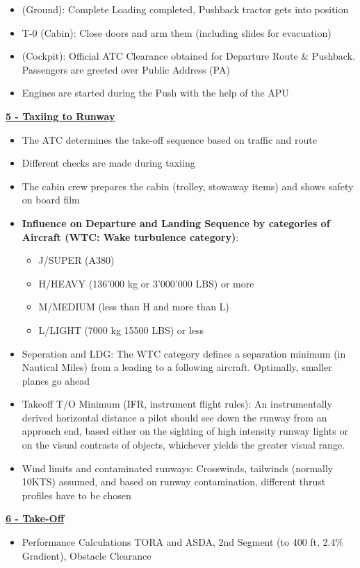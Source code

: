 \documentclass[9pt, landscape, fleqn]{scrartcl}
\begin{document}
\begin{multicols*}{3}
\begin{itemize}
    \item (Ground): Complete Loading completed, Pushback tractor gets into position 
    \item T-0 (Cabin): Close doors and arm them (including slides for evacuation)
    \item (Cockpit): Official ATC Clearance obtained for Departure Route \& Pushback. Passengers are greeted over Public Address (PA)
    \item Engines are started during the Push with the help of the APU   
\end{itemize}
\underline{\textbf{5 - Taxiing to Runway }}
\begin{itemize}
    \item The ATC determines the take-off sequence based on traffic and route 
    \item Different checks are made during taxiing 
    \item The cabin crew prepares the cabin (trolley, stowaway items) and shows safety on board film 
    \item \textbf{Influence on Departure and Landing Sequence by categories of Aircraft (WTC: Wake turbulence category)}: 
    \begin{itemize}
        \item J/SUPER (A380)
        \item H/HEAVY (136'000 kg or 3'000'000 LBS) or more
        \item M/MEDIUM (less than H and more than L)
        \item L/LIGHT (7000 kg 15500 LBS) or less
    \end{itemize}
    \item Seperation and LDG: The WTC category defines a separation minimum (in Nautical Miles) from a leading to a following aircraft. Optimally, smaller planes go ahead
    \item Takeoff T/O Minimum (IFR, instrument flight rules): An instrumentally derived horizontal distance a pilot should see down the runway from an approach end, based either on the sighting of high intensity runway lights or on the visual contrasts of objects, whichever yields the greater visual range.
    \item Wind limits and contaminated runways: Crosswinds, tailwinds (normally 10KTS) assumed, and based on runway contamination, different thrust profiles have to be chosen 
\end{itemize}
\underline{\textbf{6 - Take-Off}}
\begin{itemize}
    \item Performance Calculations TORA and ASDA, 2nd Segment (to 400 ft, 2.4\% Gradient), Obstacle Clearance

\end{itemize}
\end{multicols*}
\end{document}
